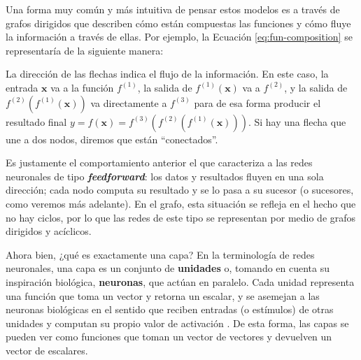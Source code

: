 \documentclass[../../main.tex]{subfiles}
\begin{document}
Una forma muy común y más intuitiva de pensar estos modelos es a través de grafos
dirigidos que describen cómo están compuestas las funciones y cómo fluye la información a
través de ellas. Por ejemplo, la Ecuación \ref{eq:fun-composition} se representaría de la
siguiente manera:
\begin{center}
\end{center}

La dirección de las flechas indica el flujo de la información. En este caso, la entrada
\(\mathbf{x}\) va a la función \(f^{(1)}\), la salida de \(f^{(1)}(\mathbf{x})\) va a
\(f^{(2)}\), y la salida de \(f^{(2)}(f^{(1)}(\mathbf{x}))\) va directamente a \(f^{(3)}\)
para de esa forma producir el resultado final \(y = f(\mathbf{x}) =
f^{(3)}(f^{(2)}(f^{(1)}(\mathbf{x})))\). Si hay una flecha que une a dos nodos, diremos
que están ``conectados''.

Es justamente el comportamiento anterior el que caracteriza a las redes neuronales de tipo
\textbf{\textit{feedforward}}: los datos y resultados fluyen en una sola dirección; cada
nodo computa su resultado y se lo pasa a su sucesor (o sucesores, como veremos más
adelante). En el grafo, esta situación se refleja en el hecho que no hay ciclos, por lo
que las redes de este tipo se representan por medio de grafos dirigidos y acíclicos.

Ahora bien, ¿qué es exactamente una capa? En la terminología de redes neuronales, una capa
es un conjunto de \textbf{unidades} o, tomando en cuenta su inspiración biológica,
\textbf{neuronas}, que actúan en paralelo. Cada unidad representa una función que toma un
vector y retorna un escalar, y se asemejan a las neuronas biológicas en el sentido que
reciben entradas (o estímulos) de otras unidades y computan su propio valor de activación
\cite{deep-learning}. De esta forma, las capas se pueden ver como funciones que toman un
vector de vectores y devuelven un vector de escalares.
\end{document}
